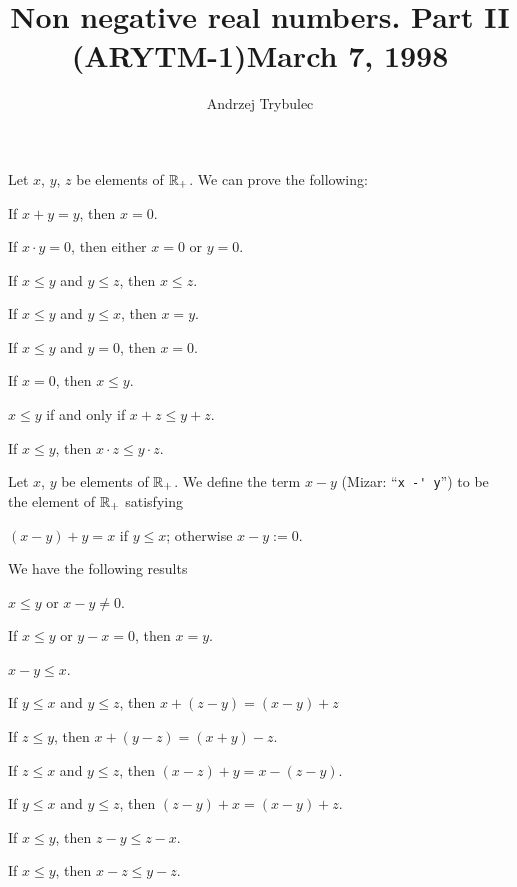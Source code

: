 \documentclass{article}
\title{Non negative real numbers. Part II (ARYTM-1)}
\author{Andrzej Trybulec}
\title{March 7, 1998}
\begin{document}
\maketitle

Let $x$, $y$, $z$ be elements of $\mathbb{R}_{+}$. We can prove the following:
\begin{thm}
\item\label{arytm1:1} If $x+y=y$, then $x=0$.
\item\label{arytm1:2} If $x\cdot y=0$, then either $x=0$ or $y=0$.
\item\label{arytm1:3} If $x\leq y$ and $y\leq z$, then $x\leq z$.
\item\label{arytm1:4} If $x\leq y$ and $y\leq x$, then $x=y$.
\item\label{arytm1:5} If $x\leq y$ and $y=0$, then $x=0$.
\item\label{arytm1:6} If $x=0$, then $x\leq y$.
\item\label{arytm1:7} $x\leq y$ if and only if $x+z\leq y+z$.
\item\label{arytm1:8} If $x\leq y$, then $x\cdot z\leq y\cdot z$.
\end{thm}

\begin{definition}
Let $x$, $y$ be elements of $\mathbb{R}_{+}$.
We define the term $x-y$ (Mizar: ``\verb#x -' y#'') to be the element of
$\mathbb{R}_{+}$ satisfying
\begin{defn}
\item $(x-y)+y=x$ if $y\leq x$; otherwise $x-y:=0$.
\end{defn}
\end{definition}

We have the following results
\begin{thm}
\item\label{arytm1:9} $x\leq y$ or $x - y\neq0$.
\item\label{arytm1:10} If $x\leq y$ or $y-x=0$, then $x=y$.
\item\label{arytm1:11} $x - y\leq x$.
\item\label{arytm1:12} If $y\leq x$ and $y\leq z$, then $x+(z-y)=(x-y)+z$
\item\label{arytm1:13} If $z\leq y$, then $x + (y - z) = (x + y) - z$.
\item\label{arytm1:14} If $z\leq x$ and $y\leq z$, then $(x - z)+y=x-(z-y)$.
\item\label{arytm1:15} If $y\leq x$ and $y\leq z$, then $(z - y)+x=(x-y)+z$.
\item\label{arytm1:16} If $x\leq y$, then $z-y\leq z-x$.
\item\label{arytm1:17} If $x\leq y$, then $x-z\leq y-z$.
\end{thm}
\end{document}
